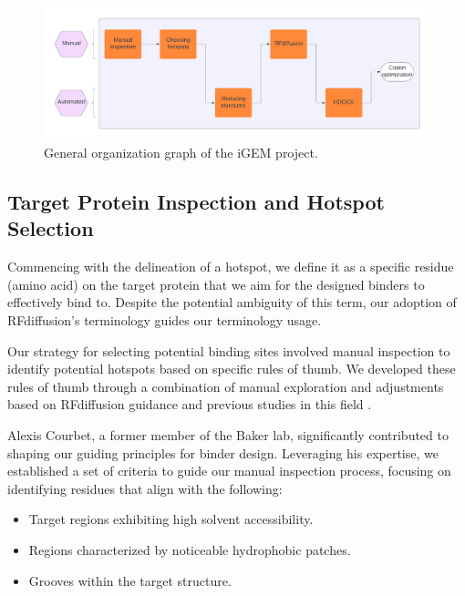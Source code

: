 \documentclass[11pt,a4paper]{article}
\begin{document}
\begin{figure}[ht]
    \centering
    \label{fig:organization_graph}
    \includegraphics[width=\textwidth]{Figures/iGEM_project_general_organization_graph.pdf}
    \caption{General organization graph of the iGEM project.}
\end{figure}

\subsection{Target Protein Inspection and Hotspot Selection}

Commencing with the delineation of a hotspot, we define it as a specific residue (amino acid) on the target protein that we aim for the designed binders to effectively bind to. Despite the potential ambiguity of this term, our adoption of RFdiffusion's terminology guides our terminology usage.

Our strategy for selecting potential binding sites involved manual inspection to identify potential hotspots based on specific rules of thumb. We developed these rules of thumb through a combination of manual exploration and adjustments based on RFdiffusion guidance \cite{rfdiffusion_github} and previous studies in this field \cite{chen2013protein}.

Alexis Courbet, a former member of the Baker lab, significantly contributed to shaping our guiding principles for binder design. Leveraging his expertise, we established a set of criteria to guide our manual inspection process, focusing on identifying residues that align with the following:

\begin{itemize}
\item Target regions exhibiting high solvent accessibility.
\item Regions characterized by noticeable hydrophobic patches.
\item Grooves within the target structure.
\end{itemize}


    
\end{document}

